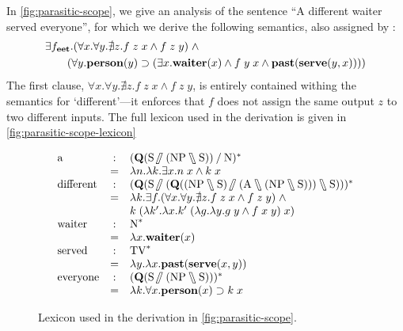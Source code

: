 \documentclass[a4paper]{article}
\begin{document}
In \autoref{fig:parasitic-scope}, we give an analysis of the sentence
``A different waiter served everyone'', for which we derive the
following semantics, also assigned by \citeauthor{kiselyov2015b}:
\begin{align*}
  &\exists{f_{\ensuremath{\mathbf{e}}\ensuremath{\mathbf{e}}\ensuremath{\mathbf{t}}}}.(\forall{x}.\forall{y}.\nexists{z}.f\;z\;x\wedge{f\;z\;y})\;\wedge\\
  &\qquad(\forall{y}.\mathbf{person}(y)\supset(\exists{x}.\mathbf{waiter}(x)\wedge{f\;y\;x\wedge\ensuremath{\mathbf{past}}(\ensuremath{\mathbf{serve}}(y,x))}))
\end{align*}
The first clause, $\forall{x}.\forall{y}.\nexists{z}.f\;z\;x\wedge
{f\;z\;y}$, is entirely contained withing the semantics for
`different'---it enforces that $f$ does not assign the same output $z$
to two different inputs. The full lexicon used in the derivation is
given in \autoref{fig:parasitic-scope-lexicon}
\begin{figure}[hb]
  \centering
  \begin{mdframed}
    \[
      \renewcommand*{\arraystretch}{1}
      \begin{array}{l c l}
        \text{a}
        &:& \tr[{(\q[\S\himpl(\NP\himpr\S)]\impl\N)}]\\
        &=& \lambda n. \lambda k. \exists x. n\;x\wedge k\;x\\

        \text{different}
        &:& \tr[{(\q[\S\himpl(\q[(\NP\himpr\S)\himpl(\A\himpr(\NP\himpr\S))]\himpr\S)])}]\\
        &=& \lambda k. \exists f. (\forall x.\forall y.\nexists z.f\;z\;x\wedge f\;z\;y)\;\wedge\\
        & & k\;(\lambda k'.\lambda x.k'\;(\lambda g.\lambda y.g\;y\wedge f\;x\;y)\;x)\\

        \text{waiter}
        &:& \tr[\N]\\
        &=& \lambda x.\WAITER(x)\\

        \text{served}
        &:& \tr[\TV]\\
        &=& \lambda y.\lambda x.\PAST(\SERVE(x,y))\\

        \text{everyone}
        &:& \tr[{(\q[\S\himpl(\NP\himpr\S)])}]\\
        &=& \lambda k.\forall x.\PERSON(x)\supset k\;x
      \end{array}
    \]
  \end{mdframed}
  \caption{Lexicon used in the derivation in \autoref{fig:parasitic-scope}.}
  \label{fig:parasitic-scope-lexicon}
\end{figure}
%

%
\end{document}

